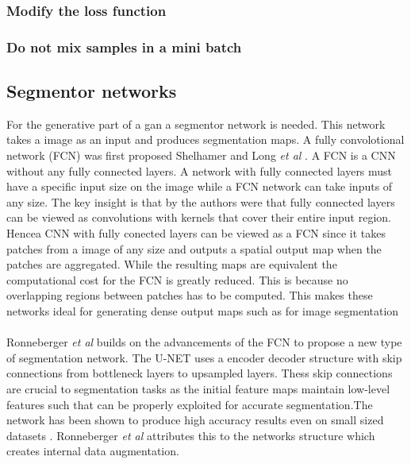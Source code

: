 \documentclass[a4paper,11pt]{article}
\begin{document}
\subsubsection{Modify the loss function}
\subsubsection{Do not mix samples in a mini batch}
\subsection{Segmentor networks}
For the generative part of a gan a segmentor network is needed. This network takes a image as an input and produces segmentation maps.
A fully convolotional network (FCN) was first proposed Shelhamer and Long \textit{et al} \citep{shelhamer_fully_2016}. A FCN is a CNN without any fully connected layers. A network with fully connected layers must have a specific input size on the image while a FCN network can take inputs of any size. The key insight is that by the authors were that fully connected layers can be viewed as convolutions with kernels that cover their entire input region. Hencea CNN with fully conected layers can be viewed as a FCN since it takes patches from a image of any size and outputs a spatial output map when the patches are aggregated. While the resulting maps are equivalent the computational cost for the FCN is greatly reduced. This is because no overlapping regions between patches has to be computed. This makes these networks ideal for generating dense output maps such as for image segmentation\\
\\
Ronneberger \textit{et al} \cite{ronneberger_u-net:_2015} builds on the advancements of the FCN to propose a new type of segmentation network. The U-NET uses a encoder decoder structure with skip connections from bottleneck layers to upsampled layers. Thess skip connections are crucial to segmentation tasks as the initial feature
maps maintain low-level features such that can be properly exploited for accurate segmentation.The network has been shown to produce high accuracy results even on small sized datasets \cite{son_retinal_2017, ronneberger_u-net:_2015, isola_image--image_2016, xue_segan:_2017, yang_automatic_2017}. Ronneberger \textit{et al} \cite{ronneberger_u-net:_2015} attributes this to the networks structure which creates internal data augmentation.
\end{document}
